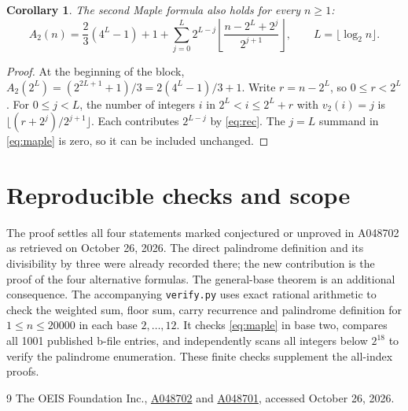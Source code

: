 \documentclass[10pt]{article}
\newtheorem{corollary}{Corollary}
\begin{document}
\begin{corollary}\label{cor:maple}
The second Maple formula also holds for every $n\ge1$:
\begin{equation}\label{eq:maple}
 A_2(n)=\frac{2}{3}(4^L-1)+1+
 \sum_{j=0}^{L}2^{L-j}
 \left\lfloor\frac{n-2^L+2^j}{2^{j+1}}\right\rfloor,
 \qquad L=\lfloor\log_2 n\rfloor.
\end{equation}
\end{corollary}
\begin{proof}
At the beginning of the block,
$A_2(2^L)=(2^{2L+1}+1)/3=2(4^L-1)/3+1$.
Write $r=n-2^L$, so $0\le r<2^L$.
For $0\le j<L$, the number of integers $i$ in
$2^L<i\le2^L+r$ with $v_2(i)=j$ is
$\lfloor(r+2^j)/2^{j+1}\rfloor$.
Each contributes $2^{L-j}$ by \eqref{eq:rec}. The $j=L$ summand
in \eqref{eq:maple} is zero, so it can be included unchanged.
\end{proof}

\section{Reproducible checks and scope}
The proof settles all four statements marked conjectured or unproved
in A048702 as retrieved on October 26, 2026. The direct palindrome
definition and its divisibility by three were already recorded there;
the new contribution is the proof of the four alternative formulas.
The general-base theorem is an additional consequence.
The accompanying \texttt{verify.py} uses exact rational arithmetic to
check the weighted sum, floor sum, carry recurrence and palindrome
definition for $1\le n\le20000$ in each base $2,\ldots,12$.
It checks \eqref{eq:maple} in base two, compares all 1001 published
b-file entries, and independently scans all integers below $2^{18}$
to verify the palindrome enumeration. These finite checks supplement
the all-index proofs.

\begin{thebibliography}{9}
 The OEIS Foundation Inc.,
\href{https://oeis.org/A048702}{A048702} and
\href{https://oeis.org/A048701}{A048701}, accessed October 26, 2026.
\end{thebibliography}
\end{document}
